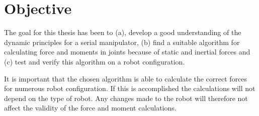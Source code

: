 \section{Objective}

The goal for this thesis has been to (a), develop a good understanding of the dynamic principles for a serial manipulator, (b) find a suitable algorithm for calculating force and moments in joints because of static and inertial forces and (c) test and verify this algorithm on a robot configuration.

It is important that the chosen algorithm is able to calculate the correct forces for numerous robot configuration. If this is accomplished the calculations will not depend on the type of robot. Any changes made to the robot will therefore not affect the validity of the force and moment calculations.
